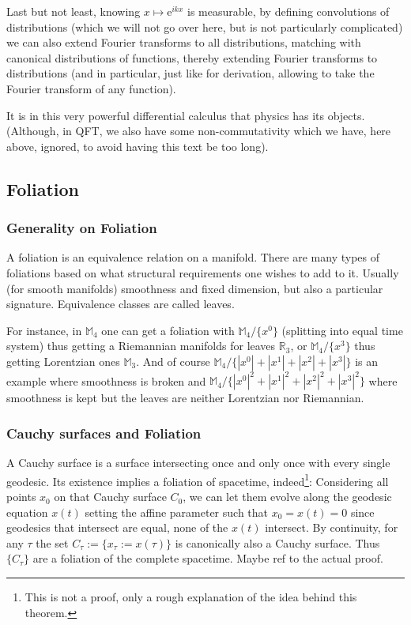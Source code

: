 \documentclass[a4paper,11pt]{article}
\numberwithin{equation}{section}
\theoremstyle{definition}
\newcommand{\e}{{\mathrm{e}}}
\begin{document}
    Last but not least, knowing $x\mapsto \e^{ikx}$ is measurable, by defining convolutions of distributions (which we will not go over here, but is not particularly complicated) we can also extend Fourier transforms to all distributions, matching with canonical distributions of functions, thereby extending Fourier transforms to distributions (and in particular, just like for derivation, allowing to take the Fourier transform of any function).

    It is in this very powerful differential calculus that physics has its objects. (Although, in QFT, we also have some non-commutativity which we have, here above, ignored, to avoid having this text be too long).
\subsection{Foliation}\label{MatFoli}
\subsubsection{Generality on Foliation}
A foliation is an equivalence relation on a manifold. There are many types of foliations based on what structural requirements one wishes to add to it. Usually (for smooth manifolds) smoothness and fixed dimension, but also a particular signature. Equivalence classes are called leaves.

For instance, in $\mathbb{M}_4$ one can get a foliation with $\mathbb{M}_4/\{x^0\}$ (splitting into equal time system) thus getting a Riemannian manifolds for leaves $\mathbb{R}_3$, or $\mathbb{M}_4/\{x^3\}$ thus getting Lorentzian ones $\mathbb{M}_3$. And of course $\mathbb{M}_4/\{|x^0|+|x^1|+|x^2|+|x^3|\}$ is an example where smoothness is broken and $\mathbb{M}_4/\{|x^0|^2+|x^1|^2+|x^2|^2+|x^3|^2\}$ where smoothness is kept but the leaves are neither Lorentzian nor Riemannian.

\subsubsection{Cauchy surfaces and Foliation}\label{CauchyMat}
A Cauchy surface is a surface intersecting once and only once with every single geodesic. Its existence implies a foliation of spacetime, indeed\footnote{This is not a proof, only a rough explanation of the idea behind this theorem.}:
Considering all points $x_0$ on that Cauchy surface $C_0$, we can let them evolve along the geodesic equation $x(t)$ setting the affine parameter such that $x_0=x(t)=0$ since geodesics that intersect are equal, none of the $x(t)$ intersect. By continuity, for any $\tau$ the set $C_\tau := \{x_\tau := x(\tau)\}$ is canonically also a Cauchy surface. Thus $\{C_\tau\}$ are a foliation of the complete spacetime. \color{red} Maybe ref to the actual proof.\color{black}
\end{document}
